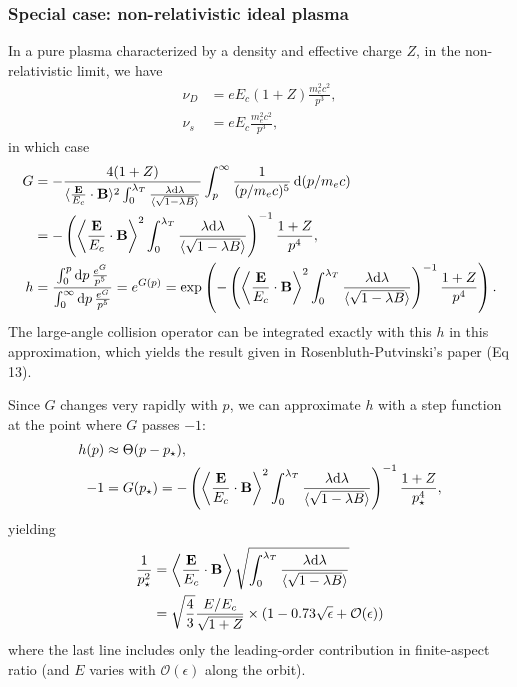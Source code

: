 \documentclass[11pt,a4paper]{article}
\newcommand{\rd}{\ensuremath{\mathrm{d}}}
\newcommand{\Ordo}{\ensuremath{\mathcal{O}}}%
\renewcommand{\b}[1]{\ensuremath{ {\bf #1 } }}
\begin{document}
\subsubsection*{Special case: non-relativistic ideal plasma}
In a pure plasma characterized by a density and effective charge $Z$, in the non-relativistic limit, we have
\begin{align}
\nu_D &= eE_c (1+Z)\frac{m_e^2 c^2}{p^3}, \nonumber \\
\nu_s &= eE_c  \frac{m_e^2 c^2}{p^3},
\end{align}
in which case
\begin{align}
G &= -\frac{ 4(1+Z)}{ \langle \frac{\b{E}}{E_c}\cdot\b{B}\rangle^2 \int_0^{\lambda_T} \frac{\lambda\rd\lambda}{\langle\sqrt{1-\lambda B}\rangle}}  \int_p^\infty \frac{1}{(p/m_e c)^5} \,\rd (p/m_ec) \nonumber \\
&= -\left(\left\langle \frac{\b{E}}{E_c}\cdot\b{B}\right\rangle^2 \int_0^{\lambda_T} \frac{\lambda\rd\lambda}{\langle\sqrt{1-\lambda B}\rangle}\right)^{-1}  \frac{1+Z}{p^4}, \nonumber \\
h &= \frac{\int_0^p \rd p \, \frac{e^G}{p^5}}{\int_0^\infty \rd p \, \frac{e^G}{p^5}}  %
= e^{G(p)} %
= \exp\left(-\left(\left\langle \frac{\b{E}}{E_c}\cdot\b{B}\right\rangle^2 \int_0^{\lambda_T} \frac{\lambda\rd\lambda}{\langle\sqrt{1-\lambda B}\rangle}\right)^{-1}  \frac{1+Z}{p^4} \right).
\end{align}
The large-angle collision operator can be integrated exactly with this $h$ in this approximation, which yields the result given in Rosenbluth-Putvinski's paper (Eq 13).

Since $G$ changes very rapidly with $p$, we can approximate $h$ with a step function at the point where $G$ passes $-1$:
\begin{align}
h(p) &\approx \Theta(p-p_\star),\nonumber \\
-1 &= G(p_\star) = -\left(\left\langle \frac{\b{E}}{E_c}\cdot\b{B}\right\rangle^2 \int_0^{\lambda_T} \frac{\lambda\rd\lambda}{\langle\sqrt{1-\lambda B}\rangle}\right)^{-1}  \frac{1+Z}{p_\star^4} ,
\end{align}
yielding
\begin{align}
\frac{1}{p_\star^2} &= \left\langle \frac{\b{E}}{E_c}\cdot\b{B}\right\rangle \sqrt{ \int_0^{\lambda_T} \frac{\lambda\rd\lambda}{\langle\sqrt{1-\lambda B}\rangle}} \nonumber \\
&= \sqrt{\frac{4}{3}}\frac{E/E_c}{\sqrt{1+Z}} \times (1-0.73\sqrt{\epsilon} + \Ordo(\epsilon))
\end{align}
where the last line includes only the leading-order contribution in finite-aspect ratio (and $E$ varies with $\Ordo(\epsilon)$ along the orbit).
\end{document}
